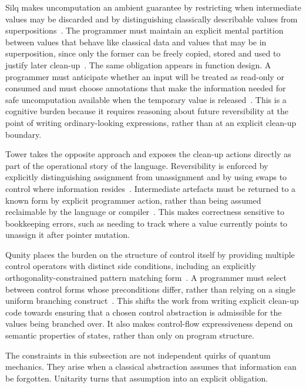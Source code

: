 Silq makes uncomputation an ambient guarantee by restricting when intermediate values may be discarded and by distinguishing classically describable values from superpositions~\cite{bichsel2020silq}.
The programmer must maintain an explicit mental partition between values that behave like classical data and values that may be in superposition, since only the former can be freely copied, stored and used to justify later clean-up~\cite{bichsel2020silq}.
The same obligation appears in function design.
A programmer must anticipate whether an input will be treated as read-only or consumed and must choose annotations that make the information needed for safe uncomputation available when the temporary value is released~\cite{bichsel2020silq}.
This is a cognitive burden because it requires reasoning about future reversibility at the point of writing ordinary-looking expressions, rather than at an explicit clean-up boundary.

Tower takes the opposite approach and exposes the clean-up actions directly as part of the operational story of the language.
Reversibility is enforced by explicitly distinguishing assignment from unassignment and by using swaps to control where information resides~\cite{yuan2025foundationalabstractions}.
Intermediate artefacts must be returned to a known form by explicit programmer action, rather than being assumed reclaimable by the language or compiler~\cite{yuan2025foundationalabstractions}.
This makes correctness sensitive to bookkeeping errors, such as needing to track where a value currently points to unassign it after pointer mutation.

Qunity places the burden on the structure of control itself by providing multiple control operators with distinct side conditions, including an explicitly orthogonality-constrained pattern matching form~\cite{mints2025qunity}.
A programmer must select between control forms whose preconditions differ, rather than relying on a single uniform branching construct~\cite{mints2025qunity}.
This shifts the work from writing explicit clean-up code towards ensuring that a chosen control abstraction is admissible for the values being branched over.
It also makes control-flow expressiveness depend on semantic properties of states, rather than only on program structure.

The constraints in this subsection are not independent quirks of quantum mechanics.
They arise when a classical abstraction assumes that information can be forgotten.
Unitarity turns that assumption into an explicit obligation.

